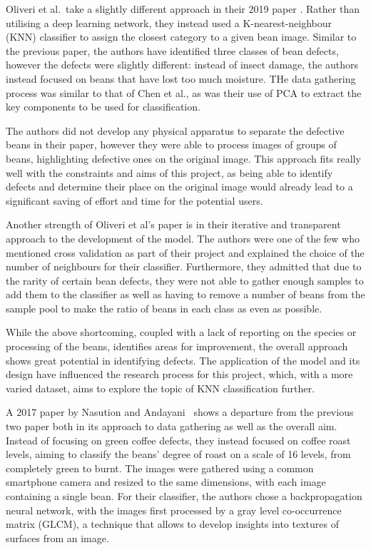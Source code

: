 Oliveri et al.\  take a slightly different approach in their 2019 paper \cite{hyperspectralGreenOliveri}.
Rather than utilising a deep learning network, they instead used a K-nearest-neighbour
(KNN) classifier to assign the closest category to a given bean image. Similar
to the previous paper, the authors have identified three classes of bean defects,
however the defects were slightly different: instead of insect damage, the
authors instead focused on beans that have lost too much moisture. THe data gathering
process was similar to that of Chen et al., as was their use of PCA to extract the
key components to be used for classification.

The authors did not develop any physical apparatus to separate the defective beans
in their paper, however they were able to process images of groups of beans, highlighting
defective ones on the original image. This approach fits really well with the
constraints and aims of this project, as being able to identify defects and determine
their place on the original image would already lead to a significant saving of effort
and time for the potential users.

Another strength of Oliveri et al's paper is in their iterative and transparent approach
to the development of the model. The authors were one of the few who mentioned
cross validation as part of their project and explained the choice of the number
of neighbours for their classifier. Furthermore, they admitted that due to the
rarity of certain bean defects, they were not able to gather enough samples to add
them to the classifier as well as having to remove a number of beans from the sample
pool to make the ratio of beans in each class as even as possible.

While the above shortcoming, coupled with a lack of reporting on the species or
processing of the beans, identifies areas for improvement, the overall approach
shows great potential in identifying defects. The application of the model and its
design have influenced the research process for this project, which, with a more
varied dataset, aims to explore the topic of KNN classification further.

A 2017 paper by Nasution and Andayani~\cite{manyRoastLevelsNasution} shows a
departure from the previous two paper both in its approach to data gathering as
well as the overall aim. Instead of focusing on green coffee defects, they
instead focused on coffee roast levels, aiming to classify the beans' degree of
roast on a scale of 16 levels, from completely green to burnt. The images were
gathered using a common smartphone camera and resized to the same dimensions, with
each image containing a single bean. For their classifier, the authors chose a backpropagation
neural network, with the images first processed by a gray level co-occurrence
matrix (GLCM), a technique that allows to develop insights into textures of surfaces
from an image.

